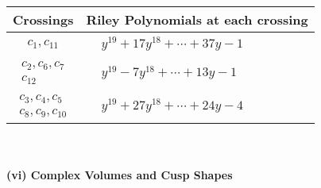 \documentclass[1p]{elsarticle_modified}
\theoremstyle{definition}
\begin{document}
\begin{tabular}{m{50pt}|m{274pt}}
Crossings & \hspace{64pt}Riley Polynomials at each crossing \\
\hline $$\begin{aligned}c_{1},c_{11}\end{aligned}$$&$\begin{aligned}
&y^{19}+17 y^{18}+\cdots+37 y-1
\end{aligned}$\\
\hline $$\begin{aligned}c_{2},c_{6},c_{7}\\c_{12}\end{aligned}$$&$\begin{aligned}
&y^{19}-7 y^{18}+\cdots+13 y-1
\end{aligned}$\\
\hline $$\begin{aligned}c_{3},c_{4},c_{5}\\c_{8},c_{9},c_{10}\end{aligned}$$&$\begin{aligned}
&y^{19}+27 y^{18}+\cdots+24 y-4
\end{aligned}$\\
\hline
\end{tabular}\\~\\
\newpage\flushleft \textbf{(vi) Complex Volumes and Cusp Shapes}
\end{document}
